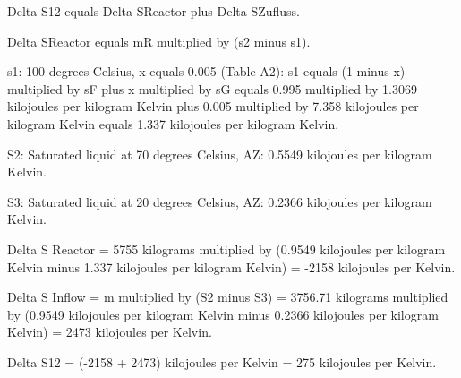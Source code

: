 Delta S12 equals Delta SReactor plus Delta SZufluss.  

Delta SReactor equals mR multiplied by (s2 minus s1).  

s1:  
100 degrees Celsius, x equals 0.005 (Table A2):  
s1 equals (1 minus x) multiplied by sF plus x multiplied by sG  
equals 0.995 multiplied by 1.3069 kilojoules per kilogram Kelvin plus 0.005 multiplied by 7.358 kilojoules per kilogram Kelvin  
equals 1.337 kilojoules per kilogram Kelvin.

S2: Saturated liquid at 70 degrees Celsius, AZ: 0.5549 kilojoules per kilogram Kelvin.  

S3: Saturated liquid at 20 degrees Celsius, AZ: 0.2366 kilojoules per kilogram Kelvin.  

Delta S Reactor = 5755 kilograms multiplied by (0.9549 kilojoules per kilogram Kelvin minus 1.337 kilojoules per kilogram Kelvin)  
= -2158 kilojoules per Kelvin.  

Delta S Inflow = m multiplied by (S2 minus S3) = 3756.71 kilograms multiplied by (0.9549 kilojoules per kilogram Kelvin minus 0.2366 kilojoules per kilogram Kelvin)  
= 2473 kilojoules per Kelvin.  

Delta S12 = (-2158 + 2473) kilojoules per Kelvin = 275 kilojoules per Kelvin.